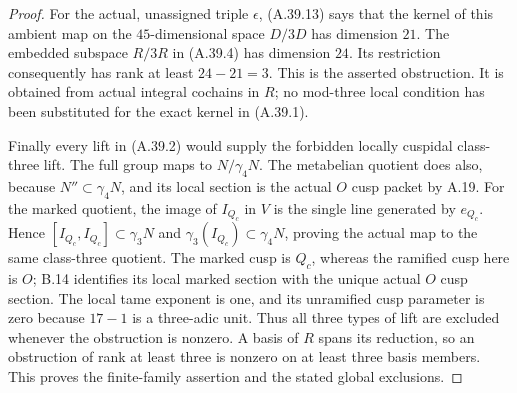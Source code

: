 \begin{proof}
For the actual, unassigned triple $\epsilon$, (A.39.13) says
that the kernel of this ambient map on the $45$-dimensional
space $D/3D$ has dimension $21$. The embedded subspace $R/3R$
in (A.39.4) has dimension $24$. Its restriction consequently
has rank at least $24-21=3$. This is the asserted obstruction.
It is obtained from actual integral cochains in $R$; no
mod-three local condition has been substituted for the exact
kernel in (A.39.1).

Finally every lift in (A.39.2) would supply the forbidden
locally cuspidal class-three lift. The full group maps to
$N/\gamma_4N$. The metabelian quotient does also, because
$N''\subset\gamma_4N$, and its local section is the actual
$O$ cusp packet by A.19. For the marked quotient, the image
of $I_{Q_c}$ in $V$ is the single line generated by $e_{Q_c}$.
Hence $[I_{Q_c},I_{Q_c}]\subset\gamma_3N$ and
$\gamma_3(I_{Q_c})\subset\gamma_4N$, proving the actual map
to the same class-three quotient. The marked cusp is $Q_c$,
whereas the ramified cusp here is $O$; B.14 identifies its
local marked section with the unique actual $O$ cusp section.
The local tame exponent is one, and its unramified cusp
parameter is zero because $17-1$ is a three-adic unit.
Thus all three types of lift are excluded whenever the
obstruction is nonzero. A basis of $R$ spans its reduction,
so an obstruction of rank at least three is nonzero on at
least three basis members. This proves the finite-family
assertion and the stated global exclusions.
\end{proof}

